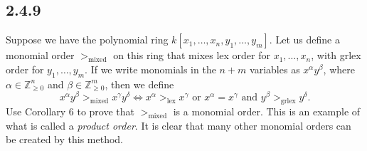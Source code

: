 \documentclass[]{article}
\newcommand\<{\langle}
\renewcommand\>{\rangle}
\newcommand{\ZZ}{\ensuremath{\mathbb{Z}}}
\begin{document}
\subsection*{2.4.9} Suppose we have the polynomial ring $k[x_1,\dots,x_n,y_1,\dots,y_m]$. Let us define a monomial order $>_\text{mixed}$ on this ring that mixes lex order for $x_1,\dots,x_n$, with grlex order for $y_1,\dots,y_m$. If we write monomials in the $n + m$ variables as $x^{\alpha}y^{\beta}$, where $\alpha \in \ZZ_{\geq 0}^n$ and $\beta \in \ZZ_{\geq 0}^{m}$, then we define
$$
	x^{\alpha}y^{\beta} >_{\text{mixed}} x^{\gamma}y^{\delta} \iff x^{\alpha} >_{\text{lex}} x^{\gamma} \text{ or } x^{\alpha} = x^{\gamma} \text{ and } y^{\beta} >_{\text{grlex}}y^\delta.
$$
Use Corollary 6 to prove that $>_\text{mixed}$ is a monomial order. This is an example of what is called a \textit{product order}. It is clear that many other monomial orders can be created by this method.
\end{document}

